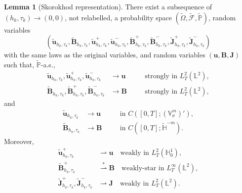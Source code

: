 \documentclass[11pt, reqno]{amsart}
\theoremstyle{definition}
\newtheorem{lemma}[theorem]{Lemma}
\numberwithin{equation}{section}
\newcommand{\bff}{\boldsymbol}
\newcommand{\bb}{\mathbb}
\begin{document}
\begin{lemma}[Skorokhod representation]
	\label{lem:conv sk representation}
	There exist a subsequence of $(h_k,\tau_k)\to(0,0)$, not
	relabelled, a probability space $(\widetilde\Omega,\widetilde{\mathscr F},\widetilde{\bb P})$, random variables
	\[
	(\widetilde{\bff u}_{h_k,\tau_k},
	\widetilde{\bff B}_{h_k,\tau_k},
	\widetilde{\bff u}_{h_k,\tau_k}^{+},
	\widetilde{\bff u}_{h_k,\tau_k}^{-},
	\widetilde{\bff B}_{h_k,\tau_k}^{+},
	\widetilde{\bff B}_{h_k,\tau_k}^{-},
	\widetilde{\bff J}_{h_k,\tau_k}^{+},
	\widetilde{\bff J}_{h_k,\tau_k}^{-})
	\]
	with the same laws as the original variables, and random variables
	$(\bff u,\bff B,\bff J)$ such that, $\widetilde{\bb P}$-a.s.,
	\begin{subequations}
	\begin{alignat}{2}
		\label{equ:conv sk u strong}
		\widetilde{\bff u}_{h_k,\tau_k},
		\widetilde{\bff u}_{h_k,\tau_k}^{+},
		\widetilde{\bff u}_{h_k,\tau_k}^{-}
		&\to\bff u
		\quad&&\text{strongly in }L^2_T(\bb L^2),
		\\
		\label{equ:conv sk B strong}
		\widetilde{\bff B}_{h_k,\tau_k},
		\widetilde{\bff B}_{h_k,\tau_k}^{+},
		\widetilde{\bff B}_{h_k,\tau_k}^{-}
		&\to\bff B
		\quad&&\text{strongly in }L^2_T(\bb L^2),
	\end{alignat}
	\end{subequations}
	and
	\begin{subequations}
		\begin{alignat}{2}
		\label{equ:conv sk path}
		\widetilde{\bff u}_{h_k,\tau_k}
		&\to\bff u
		\quad&&\text{in }C([0,T];(\bb V^m_\sigma)'),
		\\
		\label{equ:conv Bk path}
		\widetilde{\bff B}_{h_k,\tau_k}
		&\to\bff B
		\quad&&\text{in }C([0,T];\widetilde{\bb H}^{-m}).
	\end{alignat}
	\end{subequations}
	Moreover,
	\begin{subequations}
		\begin{alignat}{2}
		\label{equ:conv sk weak}
		\widetilde{\bff u}_{h_k,\tau_k}^{+}
		&\rightharpoonup\bff u
		\quad\text{weakly in }L^2_T(\bb H_0^1),
		\\
		\label{equ:conv Bk weak}
		\widetilde{\bff B}_{h_k,\tau_k}^{+}
		&\overset{*}{\rightharpoonup}\bff B
		\quad\text{weakly-star in }L^\infty_T(\bb L^2),
		\\
		\label{equ:conv Jk weak}
		\widetilde{\bff J}_{h_k,\tau_k}^{+},
		\widetilde{\bff J}_{h_k,\tau_k}^{-}
		&\rightharpoonup\bff J
		\quad\text{weakly in }L^2_T(\bb L^2).
	\end{alignat}
	\end{subequations}
\end{lemma}
\end{document}

